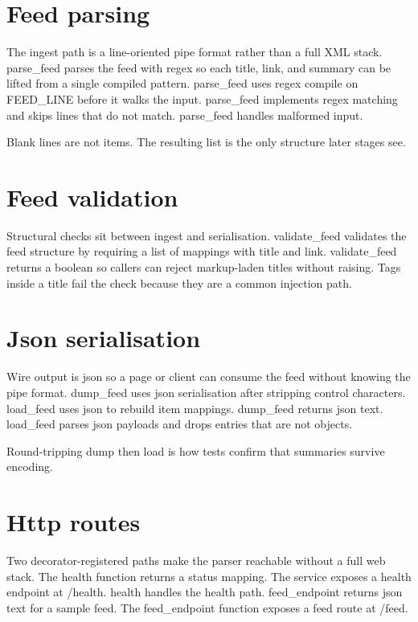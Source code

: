 \section{Feed parsing}

The ingest path is a line-oriented pipe format rather than a full XML stack. parse_feed parses the feed with regex so each title, link, and summary can be lifted from a single compiled pattern. parse_feed uses regex compile on FEED_LINE before it walks the input. parse_feed implements regex matching and skips lines that do not match. parse_feed handles malformed input.

Blank lines are not items. The resulting list is the only structure later stages see.

\section{Feed validation}

Structural checks sit between ingest and serialisation. validate_feed validates the feed structure by requiring a list of mappings with title and link. validate_feed returns a boolean so callers can reject markup-laden titles without raising. Tags inside a title fail the check because they are a common injection path.

\section{Json serialisation}

Wire output is json so a page or client can consume the feed without knowing the pipe format. dump_feed uses json serialisation after stripping control characters. load_feed uses json to rebuild item mappings. dump_feed returns json text. load_feed parses json payloads and drops entries that are not objects.

Round-tripping dump then load is how tests confirm that summaries survive encoding.

\section{Http routes}

Two decorator-registered paths make the parser reachable without a full web stack. The health function returns a status mapping. The service exposes a health endpoint at /health. health handles the health path. feed_endpoint returns json text for a sample feed. The feed_endpoint function exposes a feed route at /feed.
